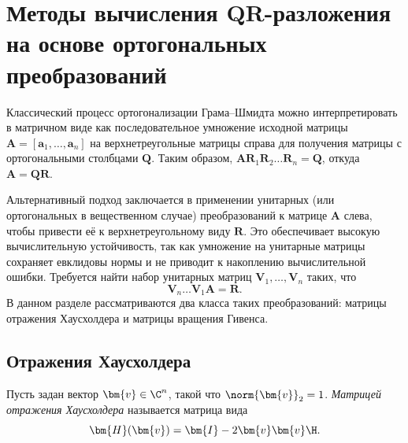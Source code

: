 \section{Методы вычисления QR-разложения на основе ортогональных преобразований}
\label{sec:qr_orthogonal}

Классический процесс ортогонализации Грама–Шмидта можно интерпретировать в матричном виде как последовательное умножение исходной матрицы $\bm{A} =[\bm{a}_1, \dots, \bm{a}_n]$ на верхнетреугольные матрицы справа для получения матрицы с ортогональными столбцами $\bm{Q}$. Таким образом, $\bm{A} \bm{R}_1 \bm{R}_2 \dots \bm{R}_n = \bm{Q}$, откуда $\bm{A} = \bm{Q}\bm{R}$.

Альтернативный подход заключается в применении унитарных (или ортогональных в вещественном случае) преобразований к матрице $\bm{A}$ слева, чтобы привести её к верхнетреугольному виду $\bm{R}$. Это обеспечивает высокую вычислительную устойчивость, так как умножение на унитарные матрицы сохраняет евклидовы нормы и не приводит к накоплению вычислительной ошибки. Требуется найти набор унитарных матриц $\bm{V}_1, \dots, \bm{V}_n$ таких, что
\begin{equation}
    \bm{V}_n \dots \bm{V}_1 \bm{A} = \bm{R}.
    \label{eq:left_orthogonal}
\end{equation}
В данном разделе рассматриваются два класса таких преобразований: матрицы отражения Хаусхолдера и матрицы вращения Гивенса.

\subsection{Отражения Хаусхолдера}
\label{sec:householder}

\begin{tcbdefinition}
\label{def:householder}
    Пусть задан вектор $\bm{v} \in \C^n$, такой что $\norm{\bm{v}}_2 = 1$. \textit{Матрицей отражения Хаусхолдера} называется матрица вида
    \begin{equation}
        \bm{H}(\bm{v}) = \bm{I} - 2\bm{v}\bm{v}\H.
        \label{eq:householder_def}
    \end{equation}
\end{tcbdefinition}

